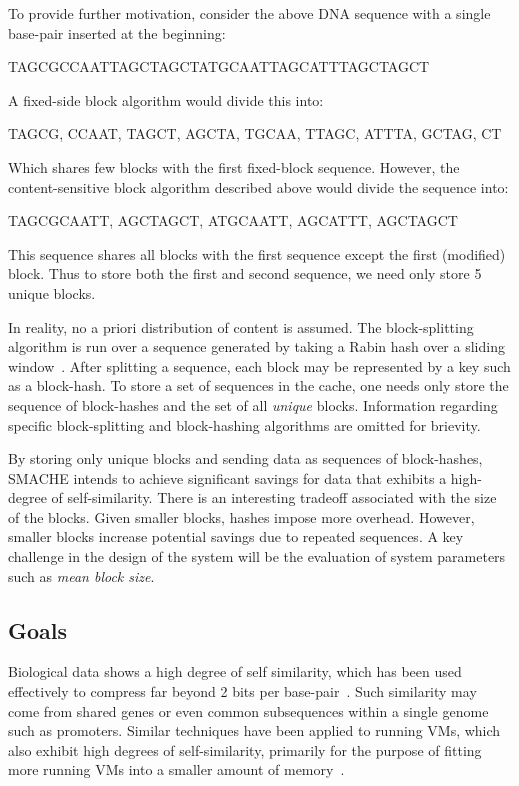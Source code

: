 \documentclass{article}[12pt]
\begin{document}
To provide further motivation, consider the above DNA sequence with a single
base-pair inserted at the beginning:
\begin{center}
TAGCGCCAATTAGCTAGCTATGCAATTAGCATTTAGCTAGCT
\end{center}
A fixed-side block algorithm would divide this into:
\begin{center}
TAGCG, CCAAT, TAGCT, AGCTA, TGCAA, TTAGC, ATTTA, GCTAG, CT
\end{center}
Which shares few blocks with the first fixed-block sequence.  However, the
content-sensitive block algorithm described above would divide the sequence
into:
\begin{center}
TAGCGCAATT, AGCTAGCT, ATGCAATT, AGCATTT, AGCTAGCT
\end{center}
This sequence shares all blocks with the first sequence except the first
(modified) block.  Thus to store both the first and second sequence, we need
only store 5 unique blocks.

In reality, no a priori distribution of content is assumed.  The
block-splitting algorithm is run over a sequence generated by taking a Rabin
hash over a sliding window~\cite{rabin}.  After splitting a sequence, each
block may be represented by a key such as a block-hash.  To store a set of
sequences in the cache, one needs only store the sequence of block-hashes and
the set of all {\em unique} blocks.  Information regarding specific
block-splitting and block-hashing algorithms are omitted for brievity.

By storing only unique blocks and sending data as sequences of block-hashes,
SMACHE intends to achieve significant savings for data that exhibits a
high-degree of self-similarity.  There is an interesting tradeoff associated
with the size of the blocks.  Given smaller blocks, hashes impose more
overhead.  However, smaller blocks increase potential savings due to repeated
sequences.  A key challenge in the design of the system will be the evaluation
of system parameters such as {\em mean block size}.

\subsection*{Goals}

Biological data shows a high degree of self similarity, which has been used
effectively to compress far beyond 2 bits per base-pair~\cite{biosequence}.
Such similarity may come from shared genes or even common subsequences within a
single genome such as promoters.  Similar techniques have been applied to
running VMs, which also exhibit high degrees of self-similarity, primarily for
the purpose of fitting more running VMs into a smaller amount of
memory~\cite{difference-engine}.
\end{document}

